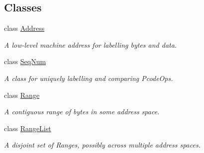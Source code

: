 \subsection*{Classes}
\begin{DoxyCompactItemize}
\item 
class \mbox{\hyperlink{class_address}{Address}}
\begin{DoxyCompactList}\small\item\em A low-\/level machine address for labelling bytes and data. \end{DoxyCompactList}\item 
class \mbox{\hyperlink{class_seq_num}{Seq\+Num}}
\begin{DoxyCompactList}\small\item\em A class for uniquely labelling and comparing Pcode\+Ops. \end{DoxyCompactList}\item 
class \mbox{\hyperlink{class_range}{Range}}
\begin{DoxyCompactList}\small\item\em A contiguous range of bytes in some address space. \end{DoxyCompactList}\item 
class \mbox{\hyperlink{class_range_list}{Range\+List}}
\begin{DoxyCompactList}\small\item\em A disjoint set of Ranges, possibly across multiple address spaces. \end{DoxyCompactList}\end{DoxyCompactItemize}
